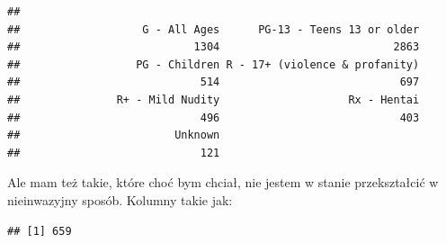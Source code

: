 \documentclass[
]{article}
\newenvironment{Shaded}{\begin{snugshade}}{\end{snugshade}}
\newcommand{\FunctionTok}[1]{\textcolor[rgb]{0.13,0.29,0.53}{\textbf{#1}}}
\newcommand{\NormalTok}[1]{#1}
\newcommand{\OtherTok}[1]{\textcolor[rgb]{0.56,0.35,0.01}{#1}}
\newcommand{\SpecialCharTok}[1]{\textcolor[rgb]{0.81,0.36,0.00}{\textbf{#1}}}
\begin{document}
\begin{Shaded}
\end{Shaded}

\begin{verbatim}
## 
##                   G - All Ages      PG-13 - Teens 13 or older 
##                           1304                           2863 
##                  PG - Children R - 17+ (violence & profanity) 
##                            514                            697 
##               R+ - Mild Nudity                    Rx - Hentai 
##                            496                            403 
##                        Unknown 
##                            121
\end{verbatim}

\begin{Shaded}
\end{Shaded}

Ale mam też takie, które choć bym chciał, nie jestem w stanie
przekształcić w nieinwazyjny sposób. Kolumny takie jak:

\begin{Shaded}
\end{Shaded}

\begin{verbatim}
## [1] 659
\end{verbatim}

\begin{Shaded}
\end{Shaded}
\end{document}
